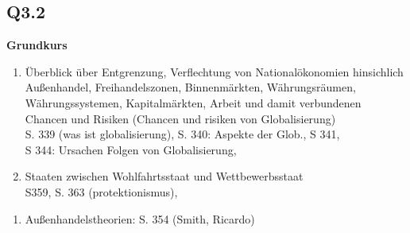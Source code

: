 \documentclass[12pt, letterpaper]{article}
\begin{document}
\subsection{Q3.2}
\label{sec:Q3.2}
\textbf{Grundkurs} 
\begin{enumerate}
  \item Überblick über Entgrenzung, Verflechtung von Nationalökonomien hinsichlich Außenhandel, Freihandelszonen, Binnenmärkten, Währungsräumen, Währungssystemen, Kapitalmärkten, Arbeit und damit verbundenen Chancen und Risiken (Chancen und risiken von Globalisierung)\\
    S. 339 (was ist globalisierung), S. 340: Aspekte der Glob., S 341, \\
    S 344: Ursachen Folgen von Globalisierung, 
  \item Staaten zwischen Wohlfahrtsstaat und Wettbewerbsstaat\\
    S359, S. 363 (protektionismus), 
\end{enumerate}
\begin{enumerate}
  \item Außenhandelstheorien: S. 354 (Smith, Ricardo)

  
\end{enumerate}
\end{document}
